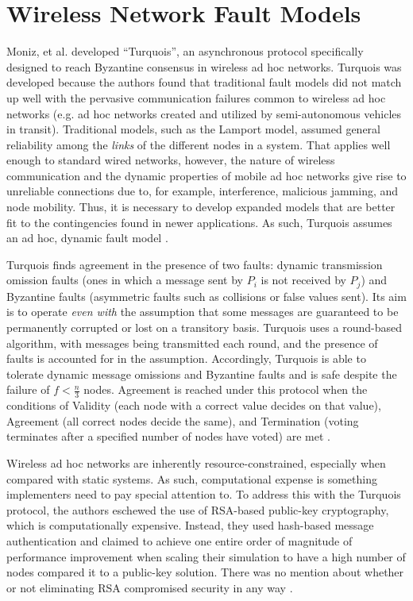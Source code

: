 \documentclass[twoside, conference]{IEEEtran}%
\begin{document}
\section{Wireless Network Fault Models}\label{sec:wireless-faultmodels}
Moniz, et al. developed ``Turquois'', an asynchronous protocol specifically designed to reach Byzantine consensus in wireless ad hoc networks. Turquois was developed because the authors found that traditional fault models did not match up well with the pervasive communication failures common to wireless ad hoc networks (e.g. ad hoc networks created and utilized by semi-autonomous vehicles in transit). Traditional models, such as the Lamport model, assumed general reliability among the \textit{links} of the different nodes in a system. That applies well enough to standard wired networks, however, the nature of wireless communication and the dynamic properties of mobile ad hoc networks give rise to unreliable connections due to, for example, interference, malicious jamming, and node mobility. Thus, it is necessary to develop expanded models that are better fit to the contingencies found in newer applications. As such, Turquois assumes an ad hoc, dynamic fault model \cite{Moniz2013}.

Turquois finds agreement in the presence of two faults: dynamic transmission omission faults (ones in which a message sent by $P_i$ is not received by $P_j$) and Byzantine faults (asymmetric faults such as collisions or false values sent). Its aim is to operate \textit{even with} the assumption that some messages are guaranteed to be permanently corrupted or lost on a transitory basis. Turquois uses a  round-based algorithm, with messages being transmitted each round, and the presence of faults is accounted for in the assumption. Accordingly, Turquois is able to tolerate dynamic message omissions and Byzantine faults and is safe despite the failure of $f < \frac{n}{3}$ nodes. Agreement is reached under this protocol when the conditions of Validity (each node with a correct value decides on that value), Agreement (all correct nodes decide the same), and Termination (voting terminates after a specified number of nodes have voted) are met \cite{Moniz2013}.

Wireless ad hoc networks are inherently resource-constrained, especially when compared with static systems. As such, computational expense is something implementers need to pay special attention to. To address this with the Turquois protocol, the authors eschewed the use of RSA-based public-key cryptography, which is computationally expensive. Instead, they used hash-based message authentication and claimed to achieve one entire order of magnitude of performance improvement when scaling their simulation to have a high number of nodes compared it to a public-key solution. There was no mention about whether or not eliminating RSA compromised security in any way \cite{Moniz2013}.
\end{document}
